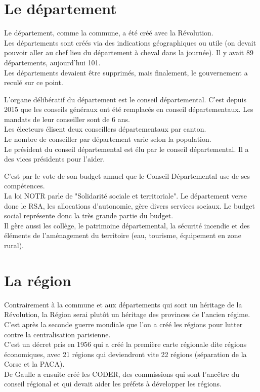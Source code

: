 \documentclass[12pt, a4paper, openany]{book}
\begin{document}
\section{Le département}

Le département, comme la commune, a été créé avec la Révolution. \\
Les départements sont créés via des indications géographiques ou utile (on devait pouvoir aller au chef lieu du département à cheval dans la journée). Il y avait 89 départements, aujourd'hui 101. \\
Les départements devaient être supprimés, mais finalement, le gouvernement a reculé sur ce point. 


L'organe délibératif du département est le conseil départemental. C'est depuis 2015 que les conseils généraux ont été remplacés en conseil départementaux. Les mandats de leur conseiller sont de 6 ans. \\
Les électeurs élisent deux conseillers départementaux par canton. \\
Le nombre de conseiller par département varie selon la population. \\
Le président du conseil départemental est élu par le conseil départemental. Il a des vices présidents pour l'aider. 


C'est par le vote de son budget annuel que le Conseil Départemental use de ses compétences. \\
La loi NOTR parle de "Solidarité sociale et territoriale". Le département verse donc le RSA, les allocations d'autonomie, gère divers services sociaux. Le budget social représente donc la très grande partie du budget. \\
Il gère aussi les collège, le patrimoine départemental, la sécurité incendie et des éléments de l'aménagement du territoire (eau, tourisme, équipement en zone rural). 


\section{La région}

Contrairement à la commune et aux départements qui sont un héritage de la Révolution, la Région serai plutôt un héritage des provinces de l'ancien régime. \\
C'est après la seconde guerre mondiale que l'on a créé les régions pour lutter contre la centralisation parisienne. \\
C'est un décret pris en 1956 qui a créé la première  carte régionale dite régions économiques, avec 21 régions qui deviendront vite 22 régions (séparation de la Corse et la PACA). \\ 
De Gaulle a ensuite créé les CODER, des commissions qui sont l'ancêtre du conseil régional et qui devait aider les préfets à développer les régions. 
\end{document}
